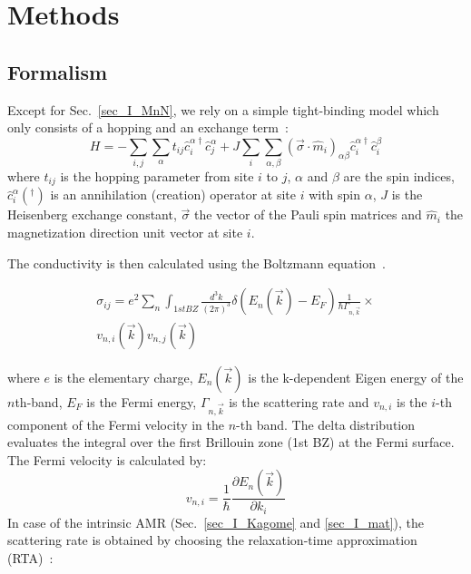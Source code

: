 \documentclass[prb,showpacs,amsmath,amssymb,superscriptaddress,twocolumn,floatfix]{revtex4-1}
\begin{document}
\section{Methods}
\label{sec_modelling}

\subsection{Formalism}

Except for Sec.~\ref{sec_I_MnN}, we rely on a simple tight-binding model which only consists of a hopping and an exchange term~\cite{Gonzalez-Hernandez:2024}:
\begin{equation}
	H = -\sum_{i, j}\sum_\alpha t_{ij} {\hat{c}_i^{\alpha\dagger}} \hat{c}^\alpha_j + J \sum_{i} \sum_{\alpha, \beta} (\vec{\sigma} \cdot \hat{m}_i)_{\alpha \beta} {\hat{c}_i^{\alpha\dagger}} \hat{c}^\beta_i 
	\label{eq_sdmodel}
\end{equation} 
where $t_{ij}$ is the hopping parameter from site $i$ to $j$, $\alpha$ and $\beta$ are the spin indices, ${\hat{c}_i^{\alpha}}(^\dagger)$ is an annihilation (creation) operator at site $i$ with spin $\alpha$, $J$ is the Heisenberg exchange constant, $\vec{\sigma}$ the vector of the Pauli spin matrices and $\hat{m}_i$ the magnetization direction unit vector at site $i$.

The conductivity is then calculated using the Boltzmann equation~\cite{Vyborny:2009}. 

\begin{multline}
	\sigma_{ij} = e^2 \sum_n  \int_ {1st BZ} \frac{d^3k}{(2\pi)^3} \delta(E_n(\vec{k}) - E_F) \frac{1}{\hbar \Gamma_{n, \vec{k}}} \times \\ v_{n,i}(\vec{k}) v_{n,j}(\vec{k})
	\label{eq_Boltzmann_1}
\end{multline}

where $e$ is the elementary charge, $E_n(\vec{k})$ is the k-dependent Eigen energy of the $n$th-band, $E_F$ is the Fermi energy, $\Gamma_{n, \vec{k}}$ is the scattering rate and $v_{n,i}$ is the $i$-th component of the Fermi velocity in the $n$-th band. The delta distribution evaluates the integral over the first Brillouin zone (1st BZ) at the Fermi surface. The Fermi velocity is calculated by:
%
\begin{equation}
	v_{n, i} = \frac{1}{\hbar} \frac{\partial E_n(\vec{k})}{\partial k_i}
\end{equation}
%
In case of the intrinsic AMR (Sec.~\ref{sec_I_Kagome} and \ref{sec_I_mat}), the scattering rate is obtained by choosing the relaxation-time approximation (RTA)~\cite{Vyborny:2009_a}:
	
\end{document}

